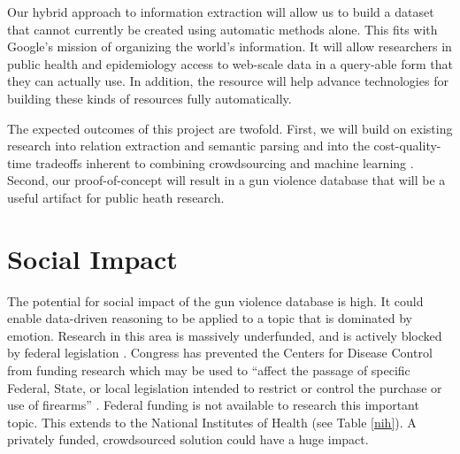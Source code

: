 \documentclass[11pt]{article}
\begin{document}

Our hybrid approach to information extraction will allow us to build a dataset that cannot currently be created using automatic methods alone. This fits with Google's mission of organizing the world's information. It will allow researchers in public health and epidemiology access to web-scale data in a query-able form that they can actually use. In addition, the resource will help advance technologies for building these kinds of resources fully automatically. 

The expected outcomes of this project are twofold.  First, we will build on existing research into relation extraction and semantic parsing \cite{mintz2009distant,cai2013semantic,yao2014information} and into the cost-quality-time tradeoffs inherent to combining crowdsourcing and machine learning \cite{Quinn11human-machinehybrid,Lin-et-al:HCOMP:2014}.  Second, our proof-of-concept will result in a gun violence database that will be a useful artifact for public heath research.

\section{Social Impact}

The potential for social impact of the gun violence database is high. It could enable data-driven reasoning to be applied to a topic that is dominated by emotion.   Research in this area is massively underfunded, and is actively blocked by federal legislation  \cite{roth1993understanding}.  Congress has prevented the Centers for Disease Control  from funding research which may be used to ``affect the passage of specific Federal, State, or local legislation intended to restrict or control the purchase or use of firearms'' \cite{kassirer1995partisan}.   Federal funding is not available to research this important topic.  This extends to the National Institutes of Health (see Table \ref{nih}).  A privately funded, crowdsourced solution could have a huge impact.
\end{document}
